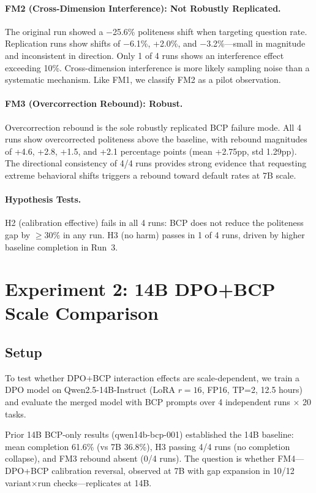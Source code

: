 \documentclass[11pt]{article}
\begin{document}
\paragraph{FM2 (Cross-Dimension Interference): Not Robustly Replicated.}
The original run showed a $-$25.6\% politeness shift when targeting question rate.
Replication runs show shifts of $-$6.1\%, +2.0\%, and $-$3.2\%---small in magnitude and inconsistent in direction.
Only 1 of 4 runs shows an interference effect exceeding 10\%.
Cross-dimension interference is more likely sampling noise than a systematic mechanism.
Like FM1, we classify FM2 as a pilot observation.

\paragraph{FM3 (Overcorrection Rebound): Robust.}
Overcorrection rebound is the sole robustly replicated BCP failure mode.
All 4 runs show overcorrected politeness above the baseline, with rebound magnitudes of +4.6, +2.8, +1.5, and +2.1 percentage points (mean +2.75pp, std 1.29pp).
The directional consistency of 4/4 runs provides strong evidence that requesting extreme behavioral shifts triggers a rebound toward default rates at 7B scale.

\paragraph{Hypothesis Tests.}
H2 (calibration effective) fails in all 4 runs: BCP does not reduce the politeness gap by $\geq$30\% in any run.
H3 (no harm) passes in 1 of 4 runs, driven by higher baseline completion in Run~3.

\section{Experiment 2: 14B DPO+BCP Scale Comparison}
\label{sec:exp2}

\subsection{Setup}

To test whether DPO+BCP interaction effects are scale-dependent, we train a DPO model on Qwen2.5-14B-Instruct (LoRA $r=16$, FP16, TP=2, 12.5 hours) and evaluate the merged model with BCP prompts over 4 independent runs $\times$ 20 tasks.

Prior 14B BCP-only results (qwen14b-bcp-001) established the 14B baseline:
mean completion 61.6\% (vs 7B 36.8\%), H3 passing 4/4 runs (no completion collapse), and FM3 rebound absent (0/4 runs).
The question is whether FM4---DPO+BCP calibration reversal, observed at 7B with gap expansion in 10/12 variant$\times$run checks---replicates at 14B.
\end{document}
